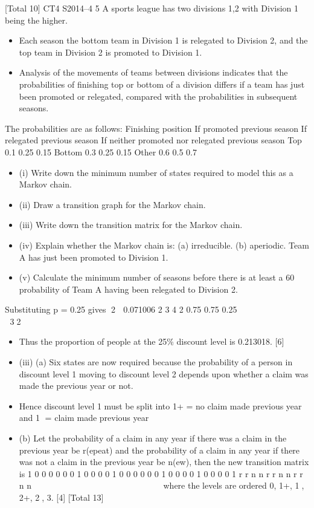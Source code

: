 \documentclass[a4paper,12pt]{article}
\begin{document}
[Total 10]
CT4 S2014–4
5 A sports league has two divisions {1,2} with Division 1 being the higher. 
\begin{itemize}
    \item Each
season the bottom team in Division 1 is relegated to Division 2, and the top team in
Division 2 is promoted to Division 1.
\item Analysis of the movements of teams between divisions indicates that the probabilities
of finishing top or bottom of a division differs if a team has just been promoted or
relegated, compared with the probabilities in subsequent seasons.
\end{itemize}
The probabilities are as follows:
  Finishing
position
If promoted
previous season
If relegated
previous season
If neither promoted
nor relegated
previous season
Top 0.1 0.25 0.15
Bottom 0.3 0.25 0.15
Other 0.6 0.5 0.7
\begin{itemize}
\item (i) Write down the minimum number of states required to model this as a Markov
chain. 
\item (ii) Draw a transition graph for the Markov chain. 
\item (iii) Write down the transition matrix for the Markov chain. 
\item (iv) Explain whether the Markov chain is:
  (a) irreducible.
(b) aperiodic. 
Team A has just been promoted to Division 1.
\item (v) Calculate the minimum number of seasons before there is at least a 60%
probability of Team A having been relegated to Division 2. 
\end{itemize}


Substituting p = 0.25 gives 2  0.071006
2
3 4 2
0.75 0.75
0.25
        
 
 32

\begin{itemize}
    \item 
Thus the proportion of people at the 25\% discount level is 0.213018. [6]
\item (iii) (a) Six states are now required
because the probability of a person in discount level 1 moving to
discount level 2 depends upon whether a claim was made the previous
year or not.
\item Hence discount level 1 must be split into
1+ = no claim made previous year and
1 = claim made previous year
\item (b) Let the probability of a claim in any year if there was a claim in the
previous year be r(epeat) and the probability of a claim in any year if
there was not a claim in the previous year be n(ew), then the new
transition matrix is
1 0 0 0 0
0 0 1 0 0
0 0 1 0 0
0 0 0 0 1
0 0 0 0 1
0 0 0 0 1
r r
n n
r r
n n
r r
n n
  
    
  
 
  
  
    
where the levels are ordered 0, 1+, 1, 2+, 2, 3. [4]
[Total 13]
\end{itemize}
\end{document}
